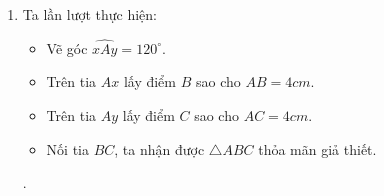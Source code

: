 \begin{bt}
{\begin{enumerate}
		Ta lần lượt thực hiện: 
	\begin{itemize}
		\item Vẽ góc $\widehat{xAy}=90^\circ$.
		\item Trên tia $Ax$ lấy điểm $B$ sao cho $AB= 6 cm$.
		\item Trên tia $Ay$ lấy điểm $C$ sao cho $AC= 8 cm$.
		\item Nối tia $BC$, ta nhận được $\triangle ABC$ thỏa mãn giả thiết.
	\end{itemize}.
\item 
	Ta lần lượt thực hiện: 
\begin{itemize}
	\item Vẽ góc $\widehat{xAy}=120^\circ$.
	\item Trên tia $Ax$ lấy điểm $B$ sao cho $AB= 4 cm$.
	\item Trên tia $Ay$ lấy điểm $C$ sao cho $AC= 4 cm$.
	\item Nối tia $BC$, ta nhận được $\triangle ABC$ thỏa mãn giả thiết.
\end{itemize}.
\end{enumerate}
	}
\end{bt}
